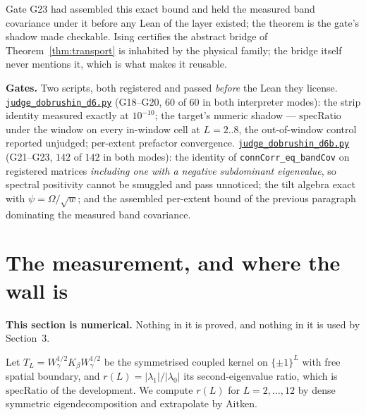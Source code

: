 \documentclass[11pt]{article}
\theoremstyle{definition}
\newcommand{\anchor}{c7b870b05bd6d1bec270d499e1358a64070ce0e1}
\newcommand{\repofile}[2]{%
  \href{https://github.com/lluiseriksson/THE-ERIKSSON-PROGRAMME/blob/\anchor/#1}{\nolinkurl{#2}}}
\newcommand{\specRatio}{\mathrm{specRatio}}
\begin{document}
Gate G23 had assembled this exact bound and held the measured band
covariance under it before any Lean of the layer existed; the theorem is
the gate's shadow made checkable.  Ising certifies the abstract bridge
of Theorem~\ref{thm:transport} is inhabited by the physical family; the
bridge itself never mentions it, which is what makes it reusable.

\textbf{Gates.}  Two scripts, both registered and passed \emph{before} the
Lean they license.
\repofile{scripts/judge\_dobrushin\_d6.py}{judge\_dobrushin\_d6.py}
(G18--G20, $60$ of $60$ in both interpreter modes): the strip identity
measured exactly at $10^{-10}$; the target's numeric shadow ---
$\specRatio$ under the window on every in-window cell at $L=2..8$, the
out-of-window control reported unjudged; per-extent prefactor convergence.
\repofile{scripts/judge\_dobrushin\_d6b.py}{judge\_dobrushin\_d6b.py}
(G21--G23, $142$ of $142$ in both modes): the identity of
\texttt{connCorr\_eq\_bandCov} on registered matrices \emph{including one
with a negative subdominant eigenvalue}, so spectral positivity cannot be
smuggled and pass unnoticed; the tilt algebra exact with
$\psi=\Omega/\sqrt{w}$; and the assembled per-extent bound of the previous
paragraph dominating the measured band covariance.

\section{The measurement, and where the wall is}
\label{sec:measurement}

\textbf{This section is numerical.}  Nothing in it is proved, and nothing in it
is used by Section~3.

Let $T_L=W_\gamma^{1/2}K_\beta W_\gamma^{1/2}$ be the symmetrised coupled kernel
on $\{\pm1\}^{L}$ with free spatial boundary, and $r(L)=|\lambda_1|/|\lambda_0|$
its second-eigenvalue ratio, which is $\specRatio$ of the development.  We
compute $r(L)$ for $L=2,\dots,12$ by dense symmetric eigendecomposition and
extrapolate by Aitken.
\end{document}
